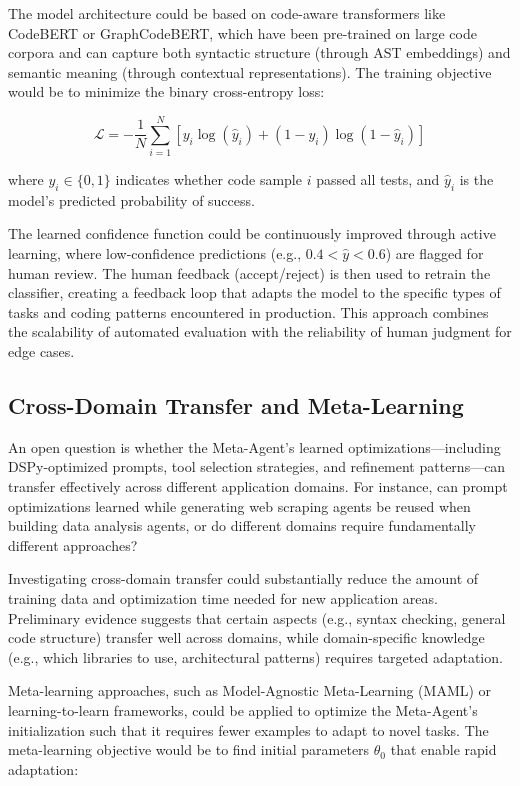 \documentclass[lettersize,journal]{IEEEtran}
\begin{document}
The model architecture could be based on code-aware transformers like CodeBERT or GraphCodeBERT, which have been pre-trained on large code corpora and can capture both syntactic structure (through AST embeddings) and semantic meaning (through contextual representations). The training objective would be to minimize the binary cross-entropy loss:

\begin{equation}
\mathcal{L} = -\frac{1}{N} \sum_{i=1}^{N} [y_i \log(\hat{y}_i) + (1 - y_i) \log(1 - \hat{y}_i)]
\end{equation}

where $y_i \in \{0, 1\}$ indicates whether code sample $i$ passed all tests, and $\hat{y}_i$ is the model's predicted probability of success.

The learned confidence function could be continuously improved through active learning, where low-confidence predictions (e.g., $0.4 < \hat{y} < 0.6$) are flagged for human review. The human feedback (accept/reject) is then used to retrain the classifier, creating a feedback loop that adapts the model to the specific types of tasks and coding patterns encountered in production. This approach combines the scalability of automated evaluation with the reliability of human judgment for edge cases.


\subsection{Cross-Domain Transfer and Meta-Learning}
An open question is whether the Meta-Agent's learned optimizations—including DSPy-optimized prompts, tool selection strategies, and refinement patterns—can transfer effectively across different application domains. For instance, can prompt optimizations learned while generating web scraping agents be reused when building data analysis agents, or do different domains require fundamentally different approaches?

Investigating cross-domain transfer could substantially reduce the amount of training data and optimization time needed for new application areas. Preliminary evidence suggests that certain aspects (e.g., syntax checking, general code structure) transfer well across domains, while domain-specific knowledge (e.g., which libraries to use, architectural patterns) requires targeted adaptation.

Meta-learning approaches, such as Model-Agnostic Meta-Learning (MAML) or learning-to-learn frameworks, could be applied to optimize the Meta-Agent's initialization such that it requires fewer examples to adapt to novel tasks. The meta-learning objective would be to find initial parameters $\theta_0$ that enable rapid adaptation:
\end{document}
